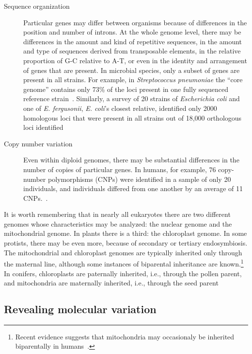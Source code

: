 \documentclass[12pt]{article}
\begin{document}
\begin{description}
\item[Sequence organization] Particular genes may differ between
  organisms because of differences in the position and number of
  introns. At the whole genome level, there may be differences in the
  amount and kind of repetitive sequences, in the amount and type of
  sequences derived from transposable elements, in the relative
  proportion of G-C relative to A-T, or even in the identity and
  arrangement of genes that are present. In microbial species, only a
  subset of genes are present in all strains. For example, in {\it
    Streptococcus pneumoniae\/} the ``core genome'' contains only 73\%
  of the loci present in one fully sequenced reference
  strain~\cite{Obert-etal-2006}. Similarly, a survey of 20 strains of
  {\it Escherichia coli\/} and one of {\it E. fergusonii\/}, {\it
    E. coli\/}'s closest relative, identified only 2000 homologous
  loci that were present in all strains out of 18,000 orthologous loci
  identified~\cite{Touchon-etal-2009}

\item[Copy number variation] Even within diploid genomes, there may be
  substantial differences in the number of copies of particular
  genes. In humans, for example, 76 copy-number polymorphisms (CNPs)
  were identified in a sample of only 20 individuals, and individuals
  differed from one another by an average of 11
  CNPs.~\cite{Sebat-etal-2004}.

\end{description}

\noindent It is worth remembering that in nearly all eukaryotes there
are two different genomes whose characteristics may be analyzed: the
nuclear genome and the mitochondrial genome. In plants there is a
third: the chloroplast genome. In some protists, there may be even
more, because of secondary or tertiary endosymbiosis. The
mitochondrial and chloroplast genomes are typically inherited only
through the maternal line, although some instances of biparental
inheritance are known.\footnote{Recent evidence suggests that
  mitochondria may occasionaly be inherited biparentally in
  humans~\cite{Luo-etal-2018}.} In conifers, chloroplasts are
paternally inherited, i.e., through the pollen parent, and
mitochondria are maternally inherited, i.e., through the seed
parent~\cite{Neale-Sederoff-1988}

\subsection*{Revealing molecular variation}
\end{document}
